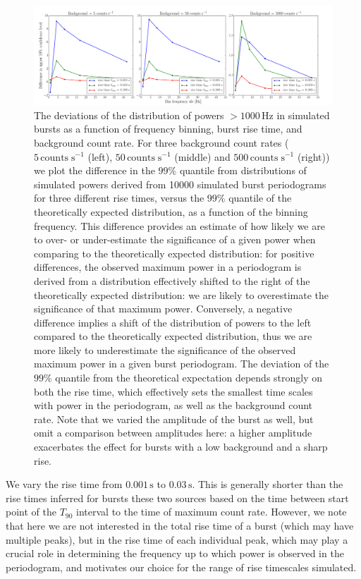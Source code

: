 \documentclass[numberedappendix]{emulateapj}
\newcommand{\hz}{\,\mathrm{Hz}}
\begin{document}
\begin{figure}[htbp]
\begin{center}
\includegraphics[width=18cm]{f6.pdf}
\caption{The deviations of the distribution of powers $>1000 \hz$ in simulated bursts as a function of frequency binning, burst rise time, and background count rate. For three background count rates ($5 \, \mathrm{counts} \; \mathrm{s}^{-1}$ (left), $50 \, \mathrm{counts} \; \mathrm{s}^{-1}$ (middle) and $500 \, \mathrm{counts} \; \mathrm{s}^{-1}$ (right)) we plot the difference in the $99\%$ quantile from distributions of simulated powers derived from 10000 simulated burst periodograms for three different rise times, versus the $99\%$ quantile of the theoretically expected distribution, as a function of the binning frequency. This difference provides an estimate of how likely we are to over- or under-estimate the significance of a given power when comparing to the theoretically expected distribution: for positive differences, the observed maximum power in a periodogram is derived from a distribution effectively shifted to the right of the theoretically expected distribution: we are likely to overestimate the significance of that maximum power. Conversely, a negative difference implies a shift of the distribution of powers to the left compared to the theoretically expected distribution, thus we are more likely to underestimate the significance of the observed maximum power in a given burst periodogram. The deviation of the $99\%$ quantile from the theoretical expectation depends strongly on both the rise time, which effectively sets the smallest time scales with power in the periodogram, as well as the background count rate. Note that we varied the amplitude of the burst as well, but omit a comparison between amplitudes here: a higher amplitude exacerbates the effect for bursts with a low background and a sharp rise.}
\label{fig:weak_bursts}
\end{center}
\end{figure}



We vary the rise time from $0.001 \, \mathrm{s}$ to $0.03 \, \mathrm{s}$. This is generally shorter than the rise times inferred for bursts these two sources based on the time between start point of the $T_{90}$ interval to the time of maximum count rate. However, we note that here we are not interested in the total rise time of a burst (which may have multiple peaks), but in the rise time of each individual peak, which may play a crucial role in determining the frequency up to which power is observed in the periodogram, and motivates our choice for the range of rise timescales simulated. 
\end{document}
